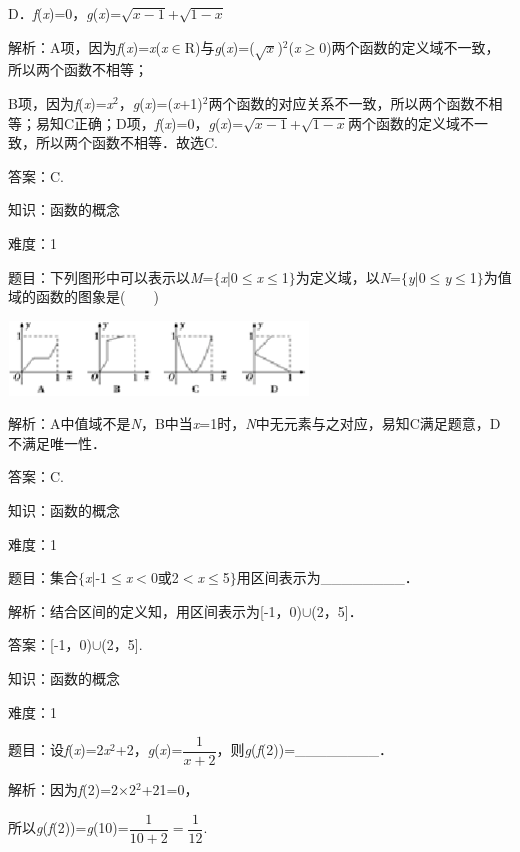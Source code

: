 \documentclass{article} %
\begin{document}
D．\textit{f}(\textit{x})=0，\textit{g}(\textit{x})=$\sqrt{x-1}$+$\sqrt{1-x}$

解析：A项，因为\textit{f}(\textit{x})=\textit{x}(\textit{x}$\mathrm{\in}$R)与\textit{g}(\textit{x})=($\sqrt{x}$)${}^{2}$(\textit{x}$\mathrm{\ge}$0)两个函数的定义域不一致，所以两个函数不相等；

B项，因为\textit{f}(\textit{x})=\textit{x}${}^{2}$，\textit{g}(\textit{x})=(\textit{x}+1)${}^{2}$两个函数的对应关系不一致，所以两个函数不相等；易知C正确；D项，\textit{f}(\textit{x})=0，\textit{g}(\textit{x})=$\sqrt{x-1}$+$\sqrt{1-x}$两个函数的定义域不一致，所以两个函数不相等．故选C.

答案：C.

知识：函数的概念

难度：1

题目：下列图形中可以表示以\textit{M}=$\mathrm{\{}$\textit{x}|0$\mathrm{\le}$\textit{x}$\mathrm{\le}$1$\mathrm{\}}$为定义域，以\textit{N}=$\mathrm{\{}$\textit{y}|0$\mathrm{\le}$\textit{y}$\mathrm{\le}$1$\mathrm{\}}$为值域的函数的图象是(　　)

\includegraphics*[width=3.15in, height=0.78in, keepaspectratio=false]{image18}

解析：A中值域不是\textit{N}，B中当\textit{x}=1时，\textit{N}中无元素与之对应，易知C满足题意，D不满足唯一性．

答案：C.

知识：函数的概念

难度：1

题目：集合$\mathrm{\{}$\textit{x}|-1$\mathrm{\le}$\textit{x}$\mathrm{<}$0或2$\mathrm{<}$\textit{x}$\mathrm{\le}$5$\mathrm{\}}$用区间表示为\_\_\_\_\_\_\_\_．

解析：结合区间的定义知，用区间表示为[-1，0)$\mathrm{\cup}$(2，5]．

答案：[-1，0)$\mathrm{\cup}$(2，5].

知识：函数的概念

难度：1

题目：设\textit{f}(\textit{x})=2\textit{x}${}^{2}$+2，\textit{g}(\textit{x})=$\dfrac{1}{x+2}$，则\textit{g}(\textit{f}(2))=\_\_\_\_\_\_\_\_．

解析：因为\textit{f}(2)=2$\mathrm{\times}$2${}^{2}$+21=0，

所以\textit{g}(\textit{f}(2))=\textit{g}(10)=$\dfrac{1}{10+2}=\dfrac{1}{12}$.
\end{document}
